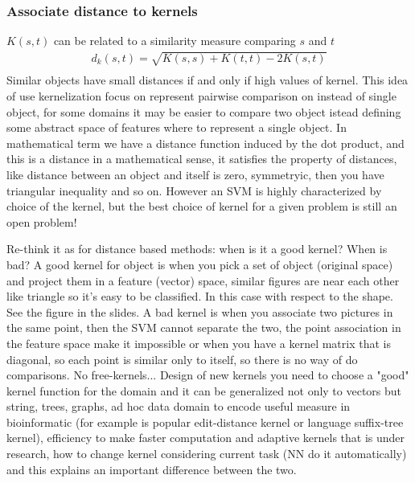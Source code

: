 \documentclass[12pt]{book}
\begin{document}
\subsubsection{Associate distance to kernels}
$K(s,t)$ can be related to a similarity measure comparing $s$ and $t$
\begin{equation}
	\begin{aligned}
		d_k(s,t) = \sqrt{K(s,s) + K(t,t) - 2K(s,t)}\\
	\end{aligned}
\end{equation}
Similar objects have small distances if and only if high values of kernel.\newline
This idea of use kernelization focus on represent pairwise comparison on instead of single object, for some domains it may be easier to compare two object istead defining some abstract space of features where to represent a single object. In mathematical term we have a distance function induced by the dot product, and this is a distance in a mathematical sense, it satisfies the property of distances, like distance between an object and itself is zero, symmetryic, then you have triangular inequality and so on.\newline
However an SVM is highly characterized by choice of the kernel, but the best choice of kernel for a given problem is still an open problem!

\Exercise{\color{red}{Exercise:}}
Re-think it as for distance based methods: when is it a good kernel? When is bad?
\newline\newline
\Answer{\color{green}{Answer of a good kernel: }}
A good kernel for object is when you pick a set of object (original space) and project them in a feature (vector) space, similar figures are near each other like triangle so it's easy to be classified. In this case with respect to the shape. See the figure in the slides.\newline
\newline\newline
{\color{green}{Answer of a bad kernel: }}
A bad kernel is when you associate two pictures in the same point, then the SVM cannot separate the two, the point association in the feature space make it impossible or when you have a kernel matrix that is diagonal, so each point is similar only to itself, so there is no way of do comparisons. No free-kernels...\newline\newline
Design of new kernels you need to choose a "good" kernel function for the domain and it can be generalized not only to vectors but string, trees, graphs, ad hoc data domain to encode useful measure in bioinformatic (for example is popular edit-distance kernel or language suffix-tree kernel), efficiency to make faster computation and adaptive kernels that is under research, how to change kernel considering current task (NN do it automatically) and this explains an important difference between the two.
\end{document}
